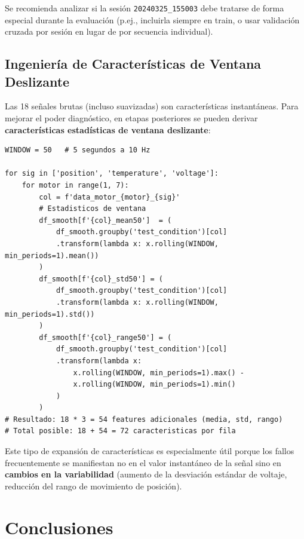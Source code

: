 \documentclass[12pt,a4paper]{article}
\begin{document}
\begin{warningbox}
Se recomienda analizar si la sesión \texttt{20240325\_155003} debe tratarse de
forma especial durante la evaluación (p.ej., incluirla siempre en train, o usar
validación cruzada por sesión en lugar de por secuencia individual).
\end{warningbox}

\subsection{Ingeniería de Características de Ventana Deslizante}

Las 18 señales brutas (incluso suavizadas) son características instantáneas.
Para mejorar el poder diagnóstico, en etapas posteriores se pueden derivar
\textbf{características estadísticas de ventana deslizante}:

\begin{lstlisting}[caption={Ejemplo de features estadísticas de ventana deslizante},
                  label={lst:window_features}]
WINDOW = 50   # 5 segundos a 10 Hz

for sig in ['position', 'temperature', 'voltage']:
    for motor in range(1, 7):
        col = f'data_motor_{motor}_{sig}'
        # Estadisticos de ventana
        df_smooth[f'{col}_mean50']  = (
            df_smooth.groupby('test_condition')[col]
            .transform(lambda x: x.rolling(WINDOW, min_periods=1).mean())
        )
        df_smooth[f'{col}_std50'] = (
            df_smooth.groupby('test_condition')[col]
            .transform(lambda x: x.rolling(WINDOW, min_periods=1).std())
        )
        df_smooth[f'{col}_range50'] = (
            df_smooth.groupby('test_condition')[col]
            .transform(lambda x:
                x.rolling(WINDOW, min_periods=1).max() -
                x.rolling(WINDOW, min_periods=1).min()
            )
        )
# Resultado: 18 * 3 = 54 features adicionales (media, std, rango)
# Total posible: 18 + 54 = 72 caracteristicas por fila
\end{lstlisting}

Este tipo de expansión de características es especialmente útil porque los fallos
frecuentemente se manifiestan no en el valor instantáneo de la señal sino en
\textbf{cambios en la variabilidad} (aumento de la desviación estándar de voltaje,
reducción del rango de movimiento de posición).

\section{Conclusiones}
\end{document}
